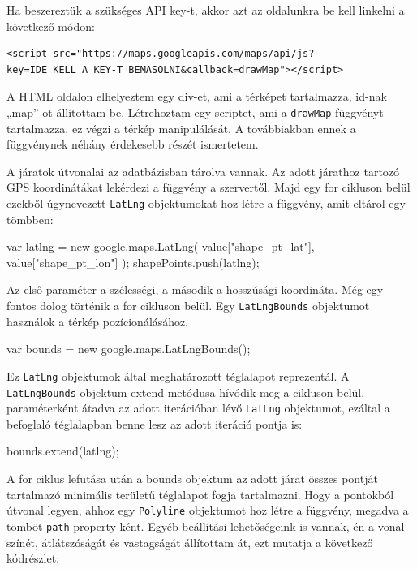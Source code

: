 Ha beszereztük a szükséges API key-t, akkor azt az oldalunkra be kell linkelni a következő módon:

\begin{verbatim}
<script src="https://maps.googleapis.com/maps/api/js?
key=IDE_KELL_A_KEY-T_BEMASOLNI&callback=drawMap"></script>
\end{verbatim}

A HTML oldalon elhelyeztem egy div-et, ami a térképet tartalmazza, id-nak „map”-ot állítottam be. Létrehoztam egy scriptet, ami a \texttt{drawMap} függvényt tartalmazza, ez végzi a térkép manipulálását. A továbbiakban ennek a függvénynek néhány érdekesebb részét ismertetem.

A járatok útvonalai az adatbázisban tárolva vannak. Az adott járathoz tartozó GPS koordinátákat lekérdezi a függvény a szervertől. Majd egy for cikluson belül ezekből úgynevezett \texttt{LatLng} objektumokat hoz létre a függvény, amit eltárol egy tömbben:

\begin{cpp}
var latlng = new google.maps.LatLng(
    value["shape_pt_lat"],
    value["shape_pt_lon"]
);
shapePoints.push(latlng);
\end{cpp}

Az első paraméter a szélességi, a második a hosszúsági koordináta. Még egy fontos dolog történik a for cikluson belül. Egy \texttt{LatLngBounds} objektumot használok a térkép pozícionálásához.

\begin{cpp}
var bounds = new google.maps.LatLngBounds();
\end{cpp}

Ez \texttt{LatLng} objektumok által meghatározott téglalapot reprezentál. A \texttt{LatLngBounds} objektum extend metódusa hívódik meg a cikluson belül, paraméterként átadva az adott iterációban lévő \texttt{LatLng} objektumot, ezáltal a befoglaló téglalapban benne lesz az adott iteráció pontja is:

\begin{cpp}
bounds.extend(latlng);
\end{cpp}

A for ciklus lefutása után a bounds objektum az adott járat összes pontját tartalmazó minimális területű téglalapot fogja tartalmazni.
Hogy a pontokból útvonal legyen, ahhoz egy \texttt{Polyline} objektumot hoz létre a függvény, megadva a tömböt \texttt{path} property-ként. Egyéb beállítási lehetőségeink is vannak, én a vonal színét, átlátszóságát és vastagságát állítottam át, ezt mutatja a következő kódrészlet:

